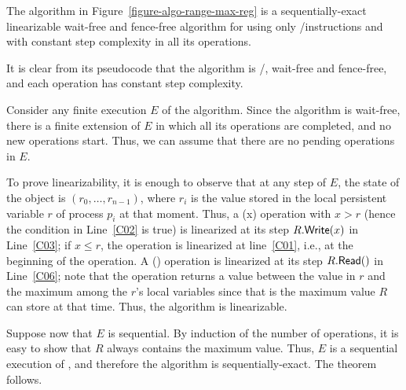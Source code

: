 \vspace{1cm}
\begin{theorem}\label{theo-range-max-reg}
  The algorithm in Figure~\ref{figure-algo-range-max-reg} is a sequentially-exact linearizable wait-free and fence-free algorithm for \RangeMaxReg using only \R/\W instructions and with constant step complexity in all its operations.
\end{theorem}

\begin{proofT}
It is clear from its pseudocode that the algorithm is \R/\W, wait-free and fence-free, and each operation has constant step complexity.

Consider any finite execution \(E\) of the algorithm. Since the algorithm is wait-free, there is a finite extension of \(E\) in which all its operations are completed, and no new operations start. Thus, we can assume that there are no pending operations in \(E\).

To prove linearizability, it is enough to observe that at any step of \(E\), the state of the object is \((r_0, \hdots, r_{n-1})\), where \(r_i\) is the value stored in the local persistent variable \(r\) of process \(p_i\) at that moment.  Thus, a \RMaxW(x) operation with \(x > r\) (hence the condition in Line~\ref{C02} is {\sf \small true}) is linearized at its step \(R.{\sf Write}(x)\) in Line~\ref{C03}; if \(x \leq r\), the operation is linearized at line~\ref{C01}, i.e., at the beginning of the operation.  A \RMaxR() operation is linearized at its step \(R.{\sf Read}()\) in Line~\ref{C06}; note that the operation returns a value between the value in \(r\) and the maximum among the \(r\)'s local variables since that is the maximum value \(R\) can store at that time. Thus, the algorithm is linearizable.

Suppose now that \(E\) is sequential. By induction of the number of operations, it is easy to show that \(R\) always contains the maximum value. Thus, \(E\) is a sequential execution of \MaxReg, and therefore the algorithm is sequentially-exact. The theorem follows.
\end{proofT}

